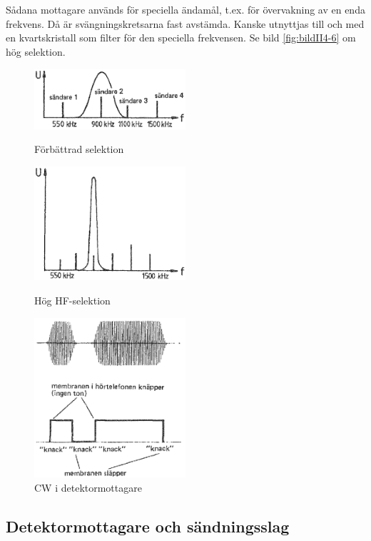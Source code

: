 Sådana mottagare används för speciella ändamål, t.ex. för övervakning
av en enda frekvens.
Då är svängningskretsarna fast avstämda.
Kanske utnyttjas till och med en kvartskristall som filter för den speciella
frekvensen.
Se bild \ref{fig:bildII4-6} om hög selektion.

\begin{figure}
  \includegraphics[width=0.5\textwidth]{images/cropped_pdfs/bild_2_4-04.pdf}
  \caption{Förbättrad selektion}
  \label{fig:bildII4-4}

  \includegraphics[width=0.5\textwidth]{images/cropped_pdfs/bild_2_4-06.pdf}
  \caption{Hög HF-selektion}
  \label{fig:bildII4-6}

  \includegraphics[width=0.5\textwidth]{images/cropped_pdfs/bild_2_4-07.pdf}
  \caption{CW i detektormottagare}
  \label{fig:bildII4-7}
\end{figure}

\subsection{Detektormottagare och sändningsslag}

